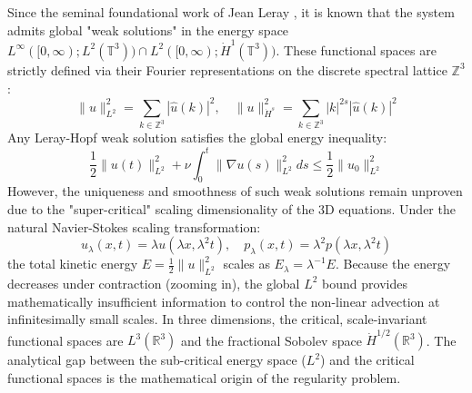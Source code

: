 \documentclass[12pt,a4paper]{article}
\theoremstyle{plain}
\theoremstyle{definition}
\theoremstyle{remark}
\begin{document}
Since the seminal foundational work of Jean Leray \cite{leray1934}, it is known that the system admits global "weak solutions" in the energy space $L^\infty([0, \infty); L^2(\mathbb{T}^3)) \cap L^2([0, \infty); \dot{H}^1(\mathbb{T}^3))$. These functional spaces are strictly defined via their Fourier representations on the discrete spectral lattice $\mathbb{Z}^3$:
\begin{equation}
    \|u\|_{L^2}^2 = \sum_{k \in \mathbb{Z}^3} |\hat{u}(k)|^2, \quad \|u\|_{\dot{H}^s}^2 = \sum_{k \in \mathbb{Z}^3} |k|^{2s} |\hat{u}(k)|^2
\end{equation}
Any Leray-Hopf weak solution satisfies the global energy inequality:
\begin{equation}
    \frac{1}{2} \|u(t)\|_{L^2}^2 + \nu \int_0^t \|\nabla u(s)\|_{L^2}^2 ds \leq \frac{1}{2} \|u_0\|_{L^2}^2
\end{equation}
However, the uniqueness and smoothness of such weak solutions remain unproven due to the "super-critical" scaling dimensionality of the 3D equations. Under the natural Navier-Stokes scaling transformation:
\begin{equation}
    u_\lambda(x,t) = \lambda u(\lambda x, \lambda^2 t), \quad p_\lambda(x,t) = \lambda^2 p(\lambda x, \lambda^2 t)
\end{equation}
the total kinetic energy $E = \frac{1}{2} \|u\|_{L^2}^2$ scales as $E_\lambda = \lambda^{-1} E$. Because the energy decreases under contraction (zooming in), the global $L^2$ bound provides mathematically insufficient information to control the non-linear advection at infinitesimally small scales. In three dimensions, the critical, scale-invariant functional spaces are $L^3(\mathbb{R}^3)$ and the fractional Sobolev space $\dot{H}^{1/2}(\mathbb{R}^3)$. The analytical gap between the sub-critical energy space ($L^2$) and the critical functional spaces is the mathematical origin of the regularity problem.
\end{document}
